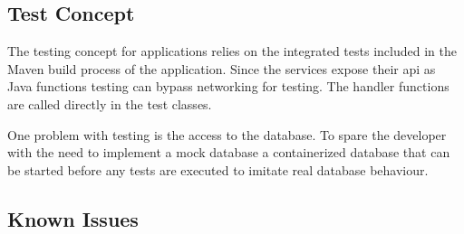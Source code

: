 \subsection{Test Concept}

The testing concept for \ms{} applications relies on the integrated tests
included in the Maven build process of the application. Since the services
expose their \gls{api} as Java functions testing can bypass networking for
testing. The handler functions are called directly in the test classes.

One problem with \ms{} testing is the access to the database. To spare the
developer with the need to implement a mock database a containerized
database that can be started before any tests are executed to imitate real
database behaviour.

\subsection{Known Issues}
